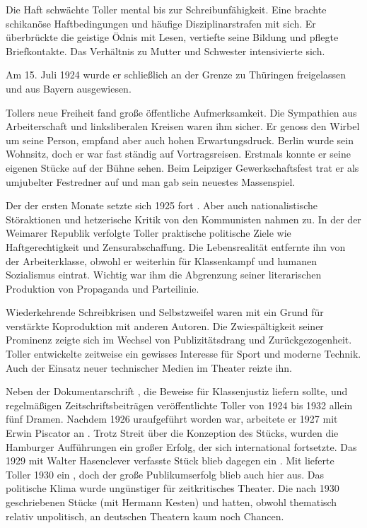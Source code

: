 Die Haft schwächte Toller mental bis zur Schreibunfähigkeit. Eine
\Cite{verschärfte Hausordung} brachte schikanöse Haftbedingungen und häufige
Disziplinarstrafen mit sich. Er überbrückte die geistige Ödnis mit Lesen,
vertiefte seine Bildung und pflegte Briefkontakte. Das Verhältnis zu Mutter
und Schwester intensivierte sich.

Am 15. Juli 1924 wurde er schließlich an der Grenze zu Thüringen freigelassen
und aus Bayern ausgewiesen.


Tollers neue Freiheit fand große öffentliche Aufmerksamkeit. Die Sympathien
aus Arbeiterschaft und linksliberalen Kreisen waren ihm sicher. Er genoss den
Wirbel um seine Person, empfand aber auch hohen Erwartungsdruck. Berlin wurde
sein Wohnsitz, doch er war fast ständig auf Vortragsreisen. Erstmals konnte er
seine eigenen Stücke auf der Bühne sehen. Beim Leipziger Gewerkschaftsfest
trat er als umjubelter Festredner auf und man gab sein neuestes Massenspiel.

Der \Cite{Triumphzug} der ersten Monate setzte sich 1925 \Cite{nahtlos} fort
.  
Aber auch nationalistische Störaktionen und hetzerische Kritik von
den Kommunisten nahmen zu. In der \Cite{relativen Stabilität} der Weimarer
Republik verfolgte Toller praktische politische Ziele wie Haftgerechtigkeit
und Zensurabschaffung. Die Lebensrealität entfernte ihn von der
Arbeiterklasse, obwohl er weiterhin für Klassenkampf und humanen Sozialismus
eintrat. Wichtig war ihm die Abgrenzung seiner literarischen Produktion von
Propaganda und Parteilinie.

Wiederkehrende Schreibkrisen und Selbstzweifel waren mit ein Grund für
verstärkte Koproduktion mit anderen Autoren. Die Zwiespältigkeit seiner
Prominenz zeigte sich im Wechsel von Publizitätsdrang und
Zurückgezogenheit. Toller entwickelte zeitweise ein gewisses Interesse für
Sport und moderne Technik. Auch der Einsatz neuer technischer Medien im
Theater reizte ihn.

Neben der Dokumentarschrift \Cite{Justiz}, die Beweise für Klassenjustiz
liefern sollte, und regelmäßigen Zeitschriftsbeiträgen veröffentlichte Toller
von 1924 bis 1932 allein fünf Dramen. Nachdem \Cite{Der entfesselte Wotan}
1926 uraufgeführt worden war, arbeitete er 1927 mit Erwin Piscator an
\Cite{Hoppla, wir leben!}. Trotz Streit über die Konzeption des Stücks, wurden
die Hamburger Aufführungen ein großer Erfolg, der sich international
fortsetzte. Das 1929 mit Walter Hasenclever verfasste Stück \Cite{Bourgeois
bleibt Bourgeois} blieb dagegen ein \Cite{Flop}. Mit \Cite{Feuer aus den
Kesseln} lieferte Toller 1930 ein \Cite{herausragendes Beispiel politischen
Dokumentartheaters}, doch der große Publikumserfolg blieb auch
hier aus. Das politische Klima wurde ungünstiger für zeitkritisches
Theater. Die nach 1930 geschriebenen Stücke \Cite{Wunder in Amerika} (mit
Hermann Kesten) und \Cite{Die blinde Göttin} hatten, obwohl thematisch relativ
unpolitisch, an deutschen Theatern kaum noch Chancen.

